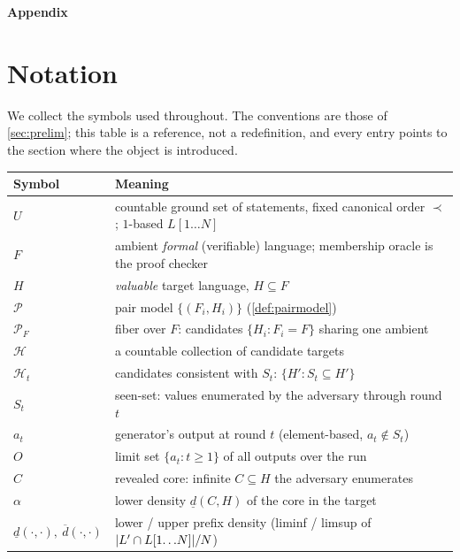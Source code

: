 \documentclass[11pt]{article}
\numberwithin{equation}{section}
\newcommand{\mc}[1]{\mathcal{#1}}
\DeclarePairedDelimiter{\abs}{\lvert}{\rvert}
\newcommand{\gnd}{U}
\newcommand{\Amb}{F}
\newcommand{\Val}{H}
\newcommand{\Pairs}{\mc{P}}
\newcommand{\Hcal}{\mc{H}}
\newcommand{\Seen}{S}
\newcommand{\Out}{O}
\newcommand{\Core}{C}
\newcommand{\dlow}[2]{\underline{d}(#1,#2)}
\newcommand{\dup}[2]{\overline{d}(#1,#2)}
\newcommand{\rest}[2]{#1[1\!\dots\! #2]}
\newcommand{\fiber}[1]{\Pairs_{#1}}
\theoremstyle{plain}
\theoremstyle{definition}
\theoremstyle{remark}
\begin{document}
 


\newpage
\appendix
\begin{center}
    \textbf{\Huge Appendix}
\end{center}
\section{Notation}
\label{app:notation}

We collect the symbols used throughout. The conventions are those of \cref{sec:prelim}; this
table is a reference, not a redefinition, and every entry points to the section where the
object is introduced.

\renewcommand{\arraystretch}{1.15}
\begin{center}\small
\begin{tabular}{@{}ll@{}}
\toprule
Symbol & Meaning \\
\midrule
$\gnd$ & countable ground set of statements, fixed canonical order $\prec$; $1$-based $\rest{L}{N}$ \\
$\Amb$ & ambient \emph{formal} (verifiable) language; membership oracle is the proof checker \\
$\Val$ & \emph{valuable} target language, $\Val \subseteq \Amb$ \\
$\Pairs$ & pair model $\{(\Amb_i, \Val_i)\}$ (\cref{def:pairmodel}) \\
$\fiber{F}$ & fiber over $F$: candidates $\{\Val_i : \Amb_i = F\}$ sharing one ambient \\
$\Hcal$ & a countable collection of candidate targets \\
$\Hcal_t$ & candidates consistent with $\Seen_t$: $\{H' : \Seen_t \subseteq H'\}$ \\
$\Seen_t$ & seen-set: values enumerated by the adversary through round $t$ \\
$a_t$ & generator's output at round $t$ (element-based, $a_t \notin \Seen_t$) \\
$\Out$ & limit set $\{a_t : t \ge 1\}$ of all outputs over the run \\
$\Core$ & revealed core: infinite $\Core \subseteq \Val$ the adversary enumerates \\
$\alpha$ & lower density $\dlow{\Core}{\Val}$ of the core in the target \\
$\dlow{\cdot}{\cdot},\ \dup{\cdot}{\cdot}$ & lower / upper prefix density (liminf / limsup of $\abs{L' \cap \rest{L}{N}}/N$) \\

\end{tabular}
\end{center}
\end{document}
